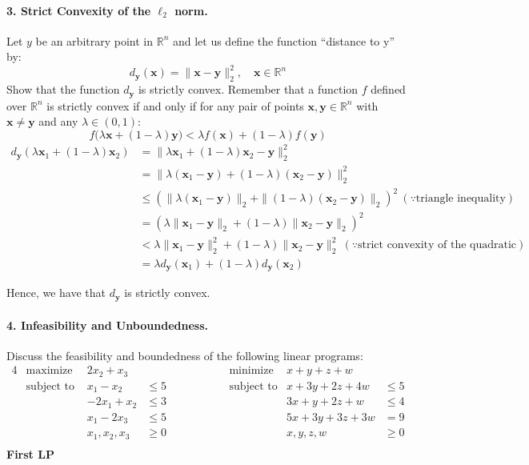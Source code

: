 \documentclass[11pt]{article}
\newcommand{\bx}{\mathbf{x}}
\newcommand{\by}{\mathbf{y}}
\begin{document}
\paragraph{3. Strict Convexity of the $\ell_2$ norm.}

Let $y$ be an arbitrary point in $\mathbb{R}^n$ and let us define the function
``distance to y'' by:
\begin{displaymath}
    d_{\by}(\bx) = \|\bx-\by\|_2^2,
    \quad \bx\in\mathbb{R}^n
\end{displaymath}
Show that the function $d_{\by}$ is strictly convex. Remember that a function $f$
defined over $\mathbb{R}^n$ is strictly convex if and only if for any pair of
points $\bx, \by\in\mathbb{R}^n$ with $\bx\neq \by$ and any $\lambda\in(0,1)$:
\begin{displaymath}
    f\big(\lambda \bx + (1-\lambda)\by\big) < \lambda f(\bx) + (1-\lambda) f(\by)
\end{displaymath}
\color{blue}
\begin{align*}
d_{\by}(\lambda\bx_1+(1-\lambda)\bx_2) &= \|\lambda \bx_1+(1-\lambda)\bx_2-\by\|_2^2 &\\
&= \|\lambda (\bx_1-\by)+(1-\lambda)(\bx_2-\by)\|_2^2 &\\
&\leq (\|\lambda (\bx_1-\by)\|_2+\| (1-\lambda)(\bx_2-\by) \|_2)^2 \ (\because \text{triangle inequality}) &\\
&= (\lambda \| \bx_1-\by\|_2+(1-\lambda) \| \bx_2-\by \|_2)^2  &\\
&< \lambda \| \bx_1-\by\|_2^2 + (1-\lambda) \| \bx_2-\by \|_2^2  \ (\because \text{strict convexity of the quadratic}) &\\
&= \lambda d_{\by}(\bx_1) + (1-\lambda) d_{\by}(\bx_2)
\end{align*}

Hence, we have that $d_{\by}$ is strictly convex.

\color{black}
\paragraph{4. Infeasibility and Unboundedness.} 

Discuss the feasibility and boundedness of the following linear programs:
\begin{alignat*}{4}
    &\text{maximize }   & 2x_2 + x_3&  &\qquad\qquad&\text{minimize}&x+y+z+w&\\
    &\text{subject to } & x_1 - x_2 &\leq 5&\qquad\qquad&\text{subject to}&x+3y+2z+4w&\leq 5\\
    &                   & -2x_1 + x_2 &\leq 3&\qquad\qquad&&3x+y+2z+w&\leq 4\\
    &                   & x_1 - 2x_3&\leq 5&\qquad\qquad&&5x+3y+3z+3w&=9\\
    &                   &x_1, x_2, x_3&\geq 0&\qquad\qquad&&x, y, z, w&\geq 0\\
\end{alignat*}
\color{blue}
\textbf{First LP}
\end{document}
